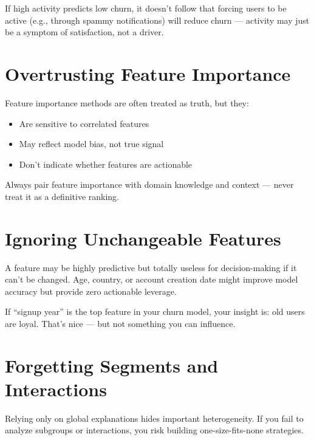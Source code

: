 \documentclass[12pt,openany, draft]{book}
\begin{document}
\begin{examplebox}
If high activity predicts low churn, it doesn’t follow that forcing users to be active (e.g., through spammy notifications) will reduce churn — activity may just be a symptom of satisfaction, not a driver.
\end{examplebox}



\section{Overtrusting Feature Importance}

Feature importance methods are often treated as truth, but they:
\begin{itemize}
  \item Are sensitive to correlated features
  \item May reflect model bias, not true signal
  \item Don’t indicate whether features are actionable
\end{itemize}

\begin{notebox}
Always pair feature importance with domain knowledge and context — never treat it as a definitive ranking.
\end{notebox}



\section{Ignoring Unchangeable Features}

A feature may be highly predictive but totally useless for decision-making if it can’t be changed. Age, country, or account creation date might improve model accuracy but provide zero actionable leverage.

\begin{examplebox}
If “signup year” is the top feature in your churn model, your insight is: old users are loyal. That’s nice — but not something you can influence.
\end{examplebox}



\section{Forgetting Segments and Interactions}

Relying only on global explanations hides important heterogeneity. If you fail to analyze subgroups or interactions, you risk building one-size-fits-none strategies.
\end{document}
